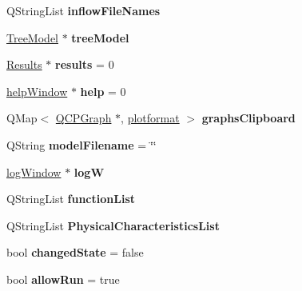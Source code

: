 \begin{DoxyCompactItemize}
Q\+String\+List {\bfseries inflow\+File\+Names}
\item 
\mbox{\label{class_graph_widget_a63a2ec518934e6d15b511684300ee123}} 
\hyperlink{class_tree_model}{Tree\+Model} $\ast$ {\bfseries tree\+Model}
\item 
\mbox{\label{class_graph_widget_a82273ec64a087561a921749f96829c16}} 
\hyperlink{class_results}{Results} $\ast$ {\bfseries results} = 0
\item 
\mbox{\label{class_graph_widget_ab0dff11cbefa39451fc2fccb51294022}} 
\hyperlink{classhelp_window}{help\+Window} $\ast$ {\bfseries help} = 0
\item 
\mbox{\label{class_graph_widget_a9fdfcfe4ce3bb3c2d008d26b244ab6e6}} 
Q\+Map$<$ \hyperlink{class_q_c_p_graph}{Q\+C\+P\+Graph} $\ast$, \hyperlink{structplotformat}{plotformat} $>$ {\bfseries graphs\+Clipboard}
\item 
\mbox{\label{class_graph_widget_aa055326989a3742d881784ab2dd49742}} 
Q\+String {\bfseries model\+Filename} = \char`\"{}\char`\"{}
\item 
\mbox{\label{class_graph_widget_a6321ee07e9d11f76aac37c43149c21be}} 
\hyperlink{classlog_window}{log\+Window} $\ast$ {\bfseries logW}
\item 
\mbox{\label{class_graph_widget_a9ce6613bd03604d6a022123bc39e1d5c}} 
Q\+String\+List {\bfseries function\+List}
\item 
\mbox{\label{class_graph_widget_ab2c90f425135bf3e7c73d06f2d8e711f}} 
Q\+String\+List {\bfseries Physical\+Characteristics\+List}
\item 
\mbox{\label{class_graph_widget_ab81bb0dddd9d8bda033f64e97ee3107f}} 
bool {\bfseries changed\+State} = false
\item 
\mbox{\label{class_graph_widget_af3bbd1a7b76e5af87df7f5e29ad939a9}} 
bool {\bfseries allow\+Run} = true
\item 
\mbox{\label{class_graph_widget_a1fc3a36c834a44f186c4741e04023d6c}} 

\end{DoxyCompactItemize}
